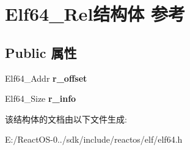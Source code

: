 \hypertarget{struct_elf64___rel}{}\section{Elf64\+\_\+\+Rel结构体 参考}
\label{struct_elf64___rel}
\subsection*{Public 属性}
\begin{DoxyCompactItemize}
\item 
\mbox{\label{struct_elf64___rel_af719169bd59569a885bf9d5df794b951}} 
Elf64\+\_\+\+Addr {\bfseries r\+\_\+offset}
\item 
\mbox{\label{struct_elf64___rel_ac3e4681d703ea5c2c927bc878f4bc1ea}} 
Elf64\+\_\+\+Size {\bfseries r\+\_\+info}
\end{DoxyCompactItemize}


该结构体的文档由以下文件生成\+:\begin{DoxyCompactItemize}
\item 
E\+:/\+React\+O\+S-\/0../sdk/include/reactos/elf/elf64.\+h\end{DoxyCompactItemize}

